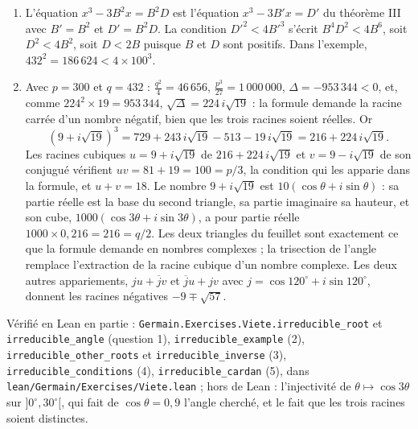 \documentclass[11pt,a4paper]{article}
\begin{document}
\begin{solution}
\begin{enumerate}
  triangle plus ou moins $\sqrt{3\,(B\sin\theta)^2}$, la droite dont le carré est
  le triple du carré de la hauteur. Dans l'exemple, $9 \pm \sqrt{57}$, soit environ
  $16{,}550$ et $1{,}450$, comme l'écrit la page (« $9 + L\,57$ vel $9 - L\,57$ ») ;
  et $x^3 - 300x - 432 = (x - 18)(x^2 + 18x + 24)$.
\item L'équation $x^3 - 3B^2x = B^2D$ est l'équation $x^3 - 3B'x = D'$ du théorème
  III avec $B' = B^2$ et $D' = B^2D$. La condition $D'^2 < 4B'^3$ s'écrit
  $B^4D^2 < 4B^6$, soit $D^2 < 4B^2$, soit $D < 2B$ puisque $B$ et $D$ sont
  positifs. Dans l'exemple, $432^2 = 186\,624 < 4 \times 100^3$.
\item Avec $p = 300$ et $q = 432$ : $\frac{q^2}{4} = 46\,656$,
  $\frac{p^3}{27} = 1\,000\,000$, $\Delta = -953\,344 < 0$, et, comme
  $224^2 \times 19 = 953\,344$, $\sqrt{\Delta} = 224\,i\sqrt{19}$ : la formule
  demande la racine carrée d'un nombre négatif, bien que les trois racines soient
  réelles. Or
  \[
  (9 + i\sqrt{19})^3 = 729 + 243\,i\sqrt{19} - 513 - 19\,i\sqrt{19}
  = 216 + 224\,i\sqrt{19} .
  \]
  Les racines cubiques $u = 9 + i\sqrt{19}$ de $216 + 224\,i\sqrt{19}$ et
  $v = 9 - i\sqrt{19}$ de son conjugué vérifient $uv = 81 + 19 = 100 = p/3$, la
  condition qui les apparie dans la formule, et $u + v = 18$. Le nombre
  $9 + i\sqrt{19}$ est $10(\cos\theta + i\sin\theta)$ : sa partie réelle est la base
  du second triangle, sa partie imaginaire sa hauteur, et son cube,
  $1000(\cos 3\theta + i\sin 3\theta)$, a pour partie réelle $1000 \times 0{,}216 =
  216 = q/2$. Les deux triangles du feuillet sont exactement ce que la formule
  demande en nombres complexes ; la trisection de l'angle remplace l'extraction de
  la racine cubique d'un nombre complexe. Les deux autres appariements,
  $ju + \overline{j}v$ et $\overline{j}u + jv$ avec $j = \cos 120^\circ + i\sin 120^\circ$,
  donnent les racines négatives $-9 \mp \sqrt{57}$.
\end{enumerate}

Vérifié en Lean en partie : \texttt{Germain.Exercises.Viete.irreducible\_root} et
\texttt{irreducible\_angle} (question 1), \texttt{irreducible\_example} (2),
\texttt{irreducible\_other\_roots} et \texttt{irreducible\_inverse} (3),
\texttt{irreducible\_conditions} (4), \texttt{irreducible\_cardan} (5), dans
\texttt{lean/Germain/Exercises/Viete.lean} ; hors de Lean : l'injectivité de $\theta \mapsto \cos 3\theta$ sur
$]0^\circ, 30^\circ[$, qui fait de $\cos\theta = 0{,}9$ l'angle cherché, et le fait que les trois
racines soient distinctes.
\end{solution}
\end{document}
